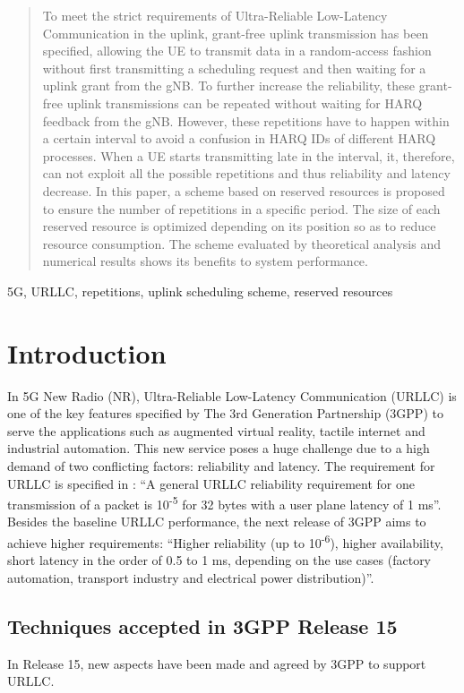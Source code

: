 \documentclass[conference]{IEEEtran}
\begin{document}
\begin{abstract}
To meet the strict requirements of Ultra-Reliable Low-Latency Communication in the uplink, grant-free uplink transmission has been specified, allowing the UE to transmit data in a random-access fashion without first transmitting a scheduling request and then waiting for a uplink grant from the gNB. To further increase the reliability, these grant-free uplink transmissions can be repeated without waiting for HARQ feedback from the gNB. However, these repetitions have to happen within a certain interval to avoid a confusion in HARQ IDs of different HARQ processes. When a UE starts transmitting late in the interval, it, therefore, can not exploit all the possible repetitions and thus reliability and latency decrease. In this paper, a scheme based on reserved resources is proposed to ensure the number of repetitions in a specific period. The size of each reserved resource is optimized depending on its position so as to reduce resource consumption. The scheme evaluated by theoretical analysis and numerical results shows its benefits to system performance.
\end{abstract}

\begin{IEEEkeywords}
5G, URLLC, repetitions, uplink scheduling scheme, reserved resources
\end{IEEEkeywords}

\section{Introduction} \label{I}
In 5G New Radio (NR), Ultra-Reliable Low-Latency Communication (URLLC) is one of the key features specified by The 3rd Generation Partnership (3GPP) to serve the applications such as augmented virtual reality, tactile internet and industrial automation. This new service poses a huge challenge due to a high demand of two conflicting factors: reliability and latency. The requirement for URLLC is specified in \cite{b6}: ``A general URLLC reliability requirement for one transmission of a packet is 10\textsuperscript{-5} for 32 bytes with a user plane latency of 1 ms''. Besides the baseline URLLC performance, the next release of 3GPP aims to achieve higher requirements: ``Higher reliability (up to 10\textsuperscript{-6}), higher availability, short latency in the order of 0.5 to 1 ms, depending on the use cases (factory automation, transport industry and electrical power distribution)''\cite{b8}.

\subsection{Techniques accepted in 3GPP Release 15}\label{IAA}
In Release 15, new aspects have been made and agreed by 3GPP to support URLLC. 
\end{document}
